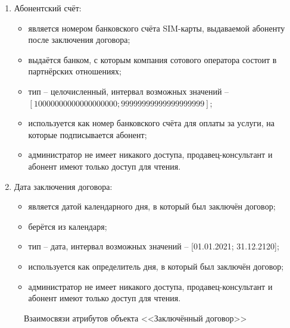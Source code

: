 \begin{enumerate}
\begin{enumerate}
        \item Абонентский счёт:
        \begin{itemize}
            \item является номером банковского счёта SIM-карты, выдаваемой абоненту после заключения договора;
            \item выдаётся банком, с которым компания сотового оператора состоит в партнёрских отношениях;
            \item тип -- целочисленный, интервал возможных значений -- $[10000000000000000000; 99999999999999999999]$;
            \item используется как номер банковского счёта для оплаты за услуги, на которые подписывается абонент;
            \item администратор не имеет никакого доступа, продавец-консультант и абонент имеют только доступ для чтения.
        \end{itemize}

        \item Дата заключения договора:
        \begin{itemize}
            \item является датой календарного дня, в который был заключён договор;
            \item берётся из календаря;
            \item тип -- дата, интервал возможных значений -- [01.01.2021; 31.12.2120];
            \item используется как определитель дня, в который был заключён договор;
            \item администратор не имеет никакого доступа, продавец-консультант и абонент имеют только доступ для чтения.
        \end{itemize}
    \end{enumerate}
    \begin{figure}[H]
        \label{fig:contract-attributes}
        \caption{Взаимосвязи атрибутов объекта <<Заключённый договор>>}
    \end{figure}
\end{enumerate}